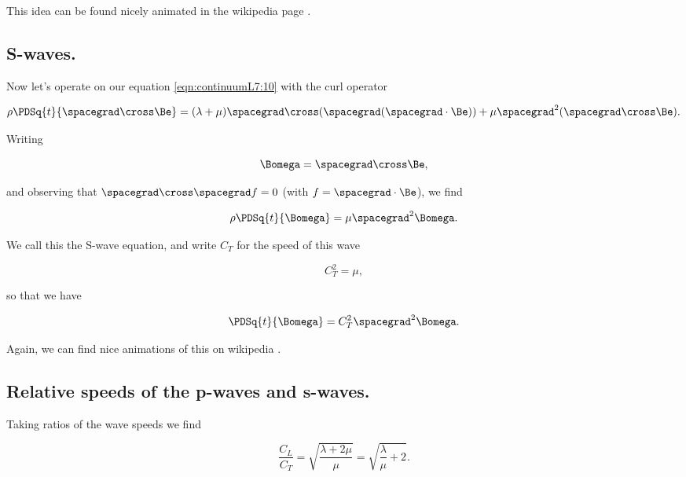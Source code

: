 This idea can be found nicely animated in the wikipedia page \cite{wiki:pwave}.

\subsection{S-waves.}

Now let's operate on our equation \ref{eqn:continuumL7:10} with the curl operator

\begin{equation}\label{eqn:continuumL7:190}
\rho \PDSq{t}{\spacegrad \cross \Be} = (\lambda + \mu) \spacegrad \cross (\spacegrad (\spacegrad \cdot \Be)) + \mu \spacegrad^2 (\spacegrad \cross \Be).
\end{equation}

Writing 

\begin{equation}\label{eqn:continuumL7:210}
\Bomega = \spacegrad \cross \Be,
\end{equation}

and observing that $\spacegrad \cross \spacegrad f = 0$ (with $f = \spacegrad \cdot \Be$), we find

\begin{equation}\label{eqn:continuumL7:230}
\rho \PDSq{t}{\Bomega} = \mu \spacegrad^2 \Bomega.
\end{equation}

We call this the S-wave equation, and write $C_T$ for the speed of this wave

\begin{equation}\label{eqn:continuumL7:250}
C_T^2 = \mu,
\end{equation}

so that we have

\begin{equation}\label{eqn:continuumL7:270}
\PDSq{t}{\Bomega} = C_T^2 \spacegrad^2 \Bomega.
\end{equation}

Again, we can find nice animations of this on wikipedia \cite{wiki:swave}.

\subsection{Relative speeds of the p-waves and s-waves.}

Taking ratios of the wave speeds we find

\begin{equation}\label{eqn:continuumL7:290}
\frac{C_L}{C_T} = \sqrt{\frac{ \lambda + 2 \mu}{\mu}} = \sqrt{ \frac{\lambda}{\mu} + 2}.
\end{equation}

